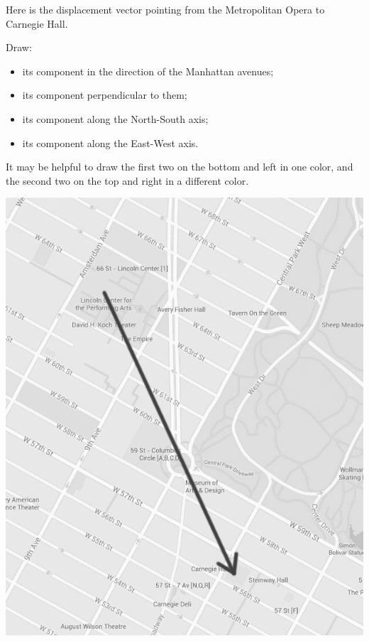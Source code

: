 \documentclass[12pt]{article}
\newcommand{\BI}{\begin{itemize}}
\newcommand{\EI}{\end{itemize}}
\def\BS{\bigskip}
\begin{document}
\begin{minipage}{0.45\textwidth}
 Here is the displacement vector pointing from the Metropolitan Opera to Carnegie Hall.
	\BS
	
	Draw:
	
	\BI
	\item its component in the direction of the Manhattan avenues;
	\item its component perpendicular to them;
	\item its component along the North-South axis;
	\item its component along the East-West axis.
	\EI

	
	It may be helpful to draw the first two on the bottom and left in one color, and the second two on the top and right in a different color.
	\vspace{1in}
	\vspace{3in}	
\end{minipage}
\hspace{0.05\textwidth}
\begin{minipage}{0.48\textwidth}
	
	\begin{center}
		
		
		\includegraphics[width=\textwidth]{manhattan-2.png}
		
	
	\end{center}
\end{minipage}
\end{document}
